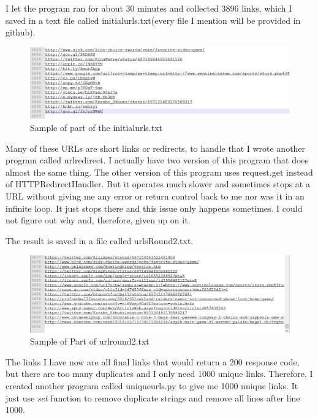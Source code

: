 \documentclass[12pt]{article}
\begin{document}


I let the program ran for about 30 minutes and collected 3896 links, which I saved in a text file called initialurls.txt(every file I mention will be provided in github).

\begin{figure}[h]
\centering
\includegraphics[width=6.5in]{Initialurls.png}
\caption{Sample of part of the initialurls.txt}
\end{figure}
\newpage

Many of these URLs are short links or redirects, to handle that I wrote another program called urlredirect. I actually have two version of this program that does almost the same thing. The other version of this program uses request.get instead of HTTPRedirectHandler. But it operates much slower and sometimes stops at a URL without giving me any error or return control back to me nor was it in an infinite loop. It just stops there and this issue only happens sometimes. I could not figure out why and, therefore, given up on it.



The result is saved in a file called urlsRound2.txt.
\newpage

\begin{figure}[h]
\centering
\includegraphics[width=6.5in]{urlround2.png}
\caption{Sample of Part of urlround2.txt}
\end{figure}

The links I have now are all final links that would return a 200 response code, but there are too many duplicates and I only need 1000 unique links. Therefore, I created another program called uniqueurls.py to give me 1000 unique links. It just use \textit{set} function to remove duplicate strings and remove all lines after line 1000.
\end{document}
